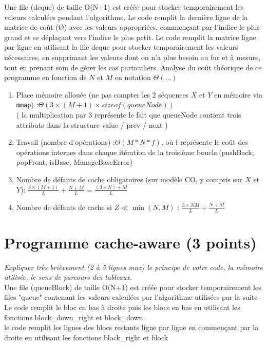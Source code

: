 \documentclass[10pt,a4paper]{article}
\begin{document}
Une file (deque) de taille O(N+1) est créée pour stocker temporairement les valeurs calculées pendant l'algorithme.
Le code remplit la dernière ligne de la matrice de coût (Ø) avec les valeurs appropriées, commençant par l'indice le plus grand et se déplaçant vers l'indice le plus petit.
Le code remplit la matrice ligne par ligne en utilisant la file deque pour stocker temporairement les valeurs nécessaires, en supprimant les valeurs dont on n'a plus besoin au fur et à mesure, tout en prenant soin de gérer les cas particuliers.
Analyse du coût théorique de ce programme en fonction de $N$ et $M$ en notation $\Theta(...)$
\begin{enumerate}
  \item Place mémoire allouée (ne pas compter les 2 séquences $X$ et $Y$ en mémoire via {\tt mmap}) :$\Theta( 3 \times(M + 1) \times sizeof(queueNode))$\\( la multiplication par 3 représente le fait que queueNode contient trois attributs dans la structure
  value / prev / next ) \\
  \item Travail (nombre d'opérations) :$\Theta(M * N * f)$, où f représente le coût des opérations internes dans chaque itération de la troisième boucle.(pushBack, popFront, isBase, ManageBaseError)
  \item Nombre de défauts de cache obligatoires (sur modèle CO, y compris sur $X$ et $Y$): $\frac{3 \times (M + 1)}{L} +\frac{N + M}{L}$ = $\frac{(3 \times N) + M}{L}$
  \item Nombre de défauts de cache si $Z \ll \min(N,M)$ : $\frac{3 \times N M}{L} +\frac{N + M}{L}$ 
\end{enumerate}

\section{Programme cache-aware (3 points)}
{\em Expliquer très brièvement (2 à 5 lignes max) le principe de votre code, la mémoire utilisée, le sens de parcours des tableaux.}
\\
Une file (queueBlock) de taille O(N+1) est créée pour stocker temporairement les files "queue" contenant les valeurs calculées par l'algorithme utilisées par la suite
Le code remplit le bloc en bas à droite puis les blocs en bas en utilisant les fonctions block_down_right et block_down. \\
le code remplit les lignes des blocs restants ligne par ligne en commençant par la droite en utilisant
les fonctions block_right et block \\
\end{document}
